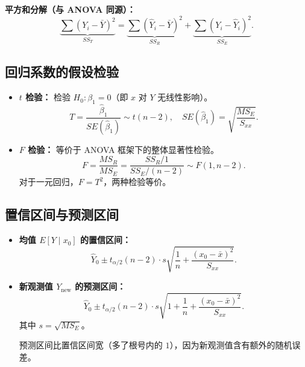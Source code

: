 \textbf{平方和分解（与 ANOVA 同源）：}
\begin{equation}
    \underbrace{\sum (Y_i - \bar{Y})^2}_{SS_T}
    = \underbrace{\sum (\hat{Y}_i - \bar{Y})^2}_{SS_R}
    + \underbrace{\sum (Y_i - \hat{Y}_i)^2}_{SS_E}.
\end{equation}

\subsection{回归系数的假设检验}

\begin{itemize}
    \item \textbf{$t$ 检验：} 检验 $H_0: \beta_1 = 0$（即 $x$ 对 $Y$ 无线性影响）。
    \begin{equation}
        T = \frac{\hat{\beta}_1}{SE(\hat{\beta}_1)} \sim t(n-2),
        \quad SE(\hat{\beta}_1) = \sqrt{\frac{MS_E}{S_{xx}}}.
    \end{equation}

    \item \textbf{$F$ 检验：} 等价于 ANOVA 框架下的整体显著性检验。
    \begin{equation}
        F = \frac{MS_R}{MS_E} = \frac{SS_R/1}{SS_E/(n-2)} \sim F(1, n-2).
    \end{equation}
    对于一元回归，$F = T^2$，两种检验等价。
\end{itemize}

\subsection{置信区间与预测区间}

\begin{itemize}
    \item \textbf{均值 $E[Y\mid x_0]$ 的置信区间：}
    \begin{equation}
        \hat{Y}_0 \pm t_{\alpha/2}(n-2) \cdot s \sqrt{\frac{1}{n} + \frac{(x_0 - \bar{x})^2}{S_{xx}}}.
    \end{equation}

    \item \textbf{新观测值 $Y_{\text{new}}$ 的预测区间：}
    \begin{equation}
        \hat{Y}_0 \pm t_{\alpha/2}(n-2) \cdot s \sqrt{1 + \frac{1}{n} + \frac{(x_0 - \bar{x})^2}{S_{xx}}}.
    \end{equation}
    其中 $s = \sqrt{MS_E}$。

    预测区间比置信区间宽（多了根号内的 $1$），因为新观测值含有额外的随机误差。
\end{itemize}

